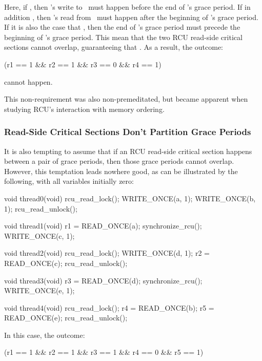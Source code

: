 Here, if , then 's write to~ must happen
before the end of 's grace period.
If in addition
, then 's read from~ must happen after
the beginning of 's grace period.
If it is also the case
that , then the end of 's grace period must
precede the beginning of 's grace period.
This mean that
the two RCU read-side critical sections cannot overlap, guaranteeing
that .
As a result, the outcome:

\begin{VerbatimU}
      (r1 == 1 && r2 == 1 && r3 == 0 && r4 == 1)
\end{VerbatimU}

\noindent%
cannot happen.

This non-requirement was also non-premeditated, but became apparent when
studying RCU's interaction with memory ordering.


\subsubsection{Read-Side Critical Sections Don't Partition Grace Periods}

It is also tempting to assume that if an RCU read-side critical section
happens between a pair of grace periods, then those grace periods cannot
overlap.
However, this temptation leads nowhere good, as can be
illustrated by the following, with all variables initially zero:

\begin{VerbatimN}
	void thread0(void)
	{
		rcu_read_lock();
		WRITE_ONCE(a, 1);
		WRITE_ONCE(b, 1);
		rcu_read_unlock();
	}

	void thread1(void)
	{
		r1 = READ_ONCE(a);
		synchronize_rcu();
		WRITE_ONCE(c, 1);
	}

	void thread2(void)
	{
		rcu_read_lock();
		WRITE_ONCE(d, 1);
		r2 = READ_ONCE(c);
		rcu_read_unlock();
	}

	void thread3(void)
	{
		r3 = READ_ONCE(d);
		synchronize_rcu();
		WRITE_ONCE(e, 1);
	}

	void thread4(void)
	{
		rcu_read_lock();
		r4 = READ_ONCE(b);
		r5 = READ_ONCE(e);
		rcu_read_unlock();
	}
\end{VerbatimN}

In this case, the outcome:

\begin{VerbatimU}
      (r1 == 1 && r2 == 1 && r3 == 1 && r4 == 0 && r5 == 1)
\end{VerbatimU}

